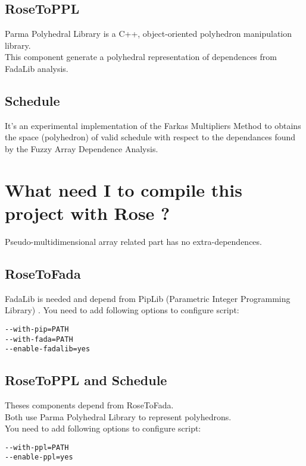 		\subsection{RoseToPPL}
		
	Parma Polyhedral Library \cite{PPL} is a C++, object-oriented polyhedron manipulation library.\\
	This component generate a polyhedral representation of dependences from FadaLib analysis.
	
		\subsection{Schedule}
		
	It's an experimental implementation of the Farkas Multipliers Method to obtains the space (polyhedron) of 
valid schedule with respect to the dependances found by the Fuzzy Array Dependence Analysis.

	\section{What need I to compile this project with Rose ?}

	Pseudo-multidimensional array related part has no extra-dependences.
	
	\subsection{RoseToFada}
	
		FadaLib \cite{FADAweb} is needed and depend from PipLib (Parametric Integer Programming Library)
\cite{PIP}.
		You need to add following options to configure script:
\begin{verbatim}
--with-pip=PATH
--with-fada=PATH
--enable-fadalib=yes
\end{verbatim}
	
	\subsection{RoseToPPL and Schedule}

		Theses components depend from RoseToFada.\\
		Both use Parma Polyhedral Library \cite{PPL} to represent polyhedrons.\\
		You need to add following options to configure script:
\begin{verbatim}
--with-ppl=PATH
--enable-ppl=yes
\end{verbatim}
		

